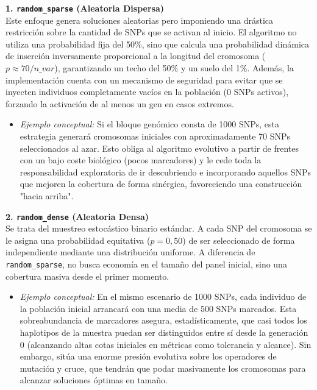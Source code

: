 \documentclass[a4paper,10pt]{article}
\begin{document}
\textbf{1. \texttt{random\_sparse} (Aleatoria Dispersa)} \\
Este enfoque genera soluciones aleatorias pero imponiendo una drástica restricción sobre la cantidad de SNPs que se activan al inicio. El algoritmo no utiliza una probabilidad fija del 50\%, sino que calcula una probabilidad dinámica de inserción inversamente proporcional a la longitud del cromosoma ($p \approx 70 / n\_var$), garantizando un techo del 50\% y un suelo del 1\%. Además, la implementación cuenta con un mecanismo de seguridad para evitar que se inyecten individuos completamente vacíos en la población (0 SNPs activos), forzando la activación de al menos un gen en casos extremos.
\begin{itemize}
    \item \textit{Ejemplo conceptual:} Si el bloque genómico consta de 1000 SNPs, esta estrategia generará cromosomas iniciales con aproximadamente 70 SNPs seleccionados al azar. Esto obliga al algoritmo evolutivo a partir de frentes con un bajo coste biológico (pocos marcadores) y le cede toda la responsabilidad exploratoria de ir descubriendo e incorporando aquellos SNPs que mejoren la cobertura de forma sinérgica, favoreciendo una construcción "hacia arriba".
\end{itemize}

\textbf{2. \texttt{random\_dense} (Aleatoria Densa)} \\
Se trata del muestreo estocástico binario estándar. A cada SNP del cromosoma se le asigna una probabilidad equitativa ($p=0,50$) de ser seleccionado de forma independiente mediante una distribución uniforme. A diferencia de \texttt{random\_sparse}, no busca economía en el tamaño del panel inicial, sino una cobertura masiva desde el primer momento.
\begin{itemize}
    \item \textit{Ejemplo conceptual:} En el mismo escenario de 1000 SNPs, cada individuo de la población inicial arrancará con una media de 500 SNPs marcados. Esta sobreabundancia de marcadores asegura, estadísticamente, que casi todos los haplotipos de la muestra puedan ser distinguidos entre sí desde la generación 0 (alcanzando altas cotas iniciales en métricas como tolerancia y alcance). Sin embargo, sitúa una enorme presión evolutiva sobre los operadores de mutación y cruce, que tendrán que podar masivamente los cromosomas para alcanzar soluciones óptimas en tamaño.
\end{itemize}
\end{document}
